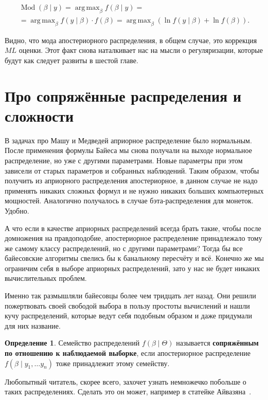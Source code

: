 \documentclass[12pt, a4paper, oneside]{extreport}
\DeclareMathOperator*{\argmax}{arg\,max}
\DeclareMathOperator{\Mod}{Mod}
\def \b{\beta}
\newcommand{\indef}[1]{\textbf{#1}}     %
\theoremstyle{plain}              %
\theoremstyle{definition}         %
\newtheorem*{definition}{Определение}  %
\begin{document}
\begin{multline*}
 \Mod(\b \mid y) = \argmax_{\b} f(\b \mid y) = \\ = \argmax_{\b} f(y \mid \b) \cdot f(\b) = \argmax_{\b} (\ln f(y \mid \b) + \ln f(\b)).
 \end{multline*}

Видно, что мода апостериорного распределения, в общем случае, это коррекция $ML$ оценки. Этот факт снова наталкивает нас на мысли о регуляризации, которые будут как следует развиты в шестой главе. 


\section{Про сопряжённые распределения и сложности}

В задачах про Машу и Медведей априорное распределение было нормальным. После применения формулы Байеса мы снова получали на выходе нормальное распределение, но уже с другими параметрами. Новые параметры при этом зависели от старых параметров и собранных наблюдений.  Таким образом, чтобы получить из априорного распределения апостериорное, в данном случае не надо применять никаких сложных формул и не нужно никаких больших компьютерных мощностей. Аналогично получалось в случае бэта-распределения для монеток. Удобно.

А что если в качестве априорных распределений всегда брать такие, чтобы после домножения на правдоподобие, апостериорное распределение принадлежало тому же самому классу распределений, но с другими параметрами? Тогда бы все байесовские алгоритмы свелись бы к банальному пересчёту и всё. Конечно же мы ограничим себя в выборе априорных распределений, зато у нас не будет никаких вычислительных проблем. 

Именно так размышляли байесовцы более чем тридцать лет назад. Они решили пожертвовать своей свободой выбора в пользу простоты вычислений и нашли кучу распределений, которые ведут себя подобным образом и даже придумали для них название.

\begin{definition}
Семейство распределений $f(\beta \mid \Theta)$ называется \indef{сопряжённым по отношению к наблюдаемой выборке}, если  апостериорное распределение $f(\beta \mid y_1, \ldots y_n)$ тоже принадлежит этому семейству. 
\end{definition}

Любопытный читатель, скорее всего, захочет узнать немножечко побольше о таких распределениях. Сделать это он может, например в статейке Айвазяна~\cite{aivaz2008}. 
\end{document}
